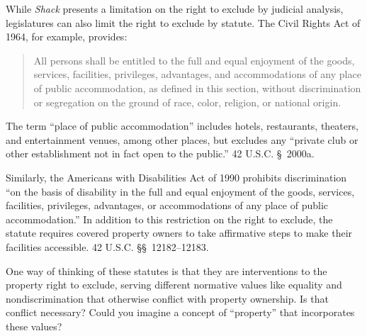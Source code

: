 \item While \emph{Shack} presents a limitation on the right to exclude by
judicial analysis, legislatures can also limit the right to exclude by statute.
The Civil Rights Act of 1964, for example, provides:
\begin{quote}
All persons shall be entitled to the full and equal enjoyment of the goods,
services, facilities, privileges, advantages, and accommodations of any place
of public accommodation, as defined in this section, without discrimination or
segregation on the ground of race, color, religion, or national origin.
\end{quote}
The term ``place of public accommodation'' includes hotels, restaurants,
theaters, and entertainment venues, among other places, but excludes any
``private club or other establishment not in fact open to the public.'' 42
U.S.C. \S~2000a.

Similarly, the Americans with Disabilities Act of 1990 prohibits discrimination
``on the basis of disability in the full and equal enjoyment of the goods,
services, facilities, privileges, advantages, or accommodations of any place of
public accommodation.'' In addition to this restriction on the right to exclude,
the statute requires covered property owners to take affirmative steps to make
their facilities accessible. 42 U.S.C. \S\S~12182--12183.

One way of thinking of these statutes is that they are interventions to the
property right to exclude, serving different normative values like equality and
nondiscrimination that otherwise conflict with property ownership. Is that
conflict necessary? Could you imagine a concept of ``property'' that
incorporates these values?

